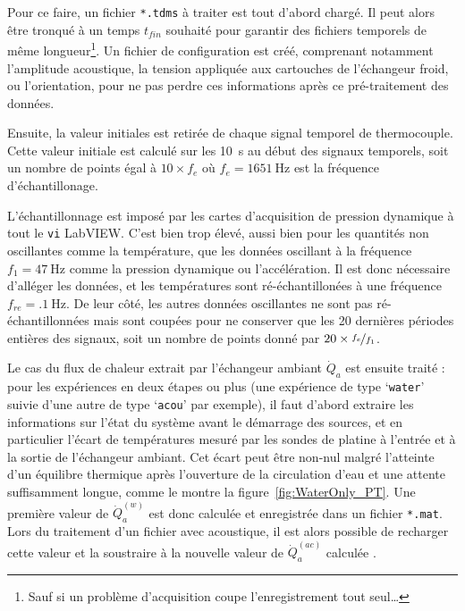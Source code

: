 Pour ce faire, un fichier \texttt{*.tdms} à traiter est tout d'abord chargé. Il peut alors être tronqué à un temps $t_{fin}$ souhaité pour garantir des fichiers temporels de même longueur\footnote{Sauf si un problème d'acquisition coupe l'enregistrement tout seul\dots}. Un fichier de configuration est créé, comprenant notamment l'amplitude acoustique, la tension appliquée aux cartouches de l'échangeur froid, ou l'orientation, pour ne pas perdre ces informations après ce pré-traitement des données.\smallskip

Ensuite, la valeur initiales est retirée de chaque signal temporel de thermocouple. Cette valeur initiale est calculé sur les \qty{10}{\second} au début des signaux temporels, soit un nombre de points égal à $10 \times f_{e}$ où $f_{e}=\qty{1651}{\hertz}$ est la fréquence d'échantillonage.\smallskip

L'échantillonnage est imposé par les cartes d'acquisition de pression dynamique à tout le \texttt{vi} LabVIEW. C'est bien trop élevé, aussi bien pour les quantités non oscillantes comme la température, que les données oscillant à la fréquence $f_1=\qty{47}{\hertz}$ comme la pression dynamique ou l'accélération. Il est donc nécessaire d'alléger les données, et les températures sont ré-échantillonées à une fréquence $f_{re}=\qty{.1}{\hertz}$. De leur côté, les autres données oscillantes ne sont pas ré-échantillonnées mais sont coupées pour ne conserver que les \num{20} dernières périodes entières des signaux, soit un nombre de points donné par $20 \times \nicefrac{f_e}{f_1}$.\smallskip

Le cas du flux de chaleur extrait par l'échangeur ambiant $\dot Q_a$ est ensuite traité : pour les expériences en deux étapes ou plus (une expérience de type `\texttt{water}' suivie d'une autre de type `\texttt{acou}' par exemple), il faut d'abord extraire les informations sur l'état du système avant le démarrage des sources, et en particulier l'écart de températures mesuré par les sondes de platine à l'entrée et à la sortie de l'échangeur ambiant. Cet écart peut être non-nul malgré l'atteinte d'un équilibre thermique après l'ouverture de la circulation d'eau et une attente suffisamment longue, comme le montre la figure~\ref{fig:WaterOnly_PT}. Une première valeur de $\dot Q_a^{(w)}$ est donc calculée et enregistrée dans un fichier \texttt{*.mat}. Lors du traitement d'un fichier avec acoustique, il est alors possible de recharger cette valeur et la soustraire à la nouvelle valeur de $\dot Q_a^{(ac)}$ calculée .\smallskip

